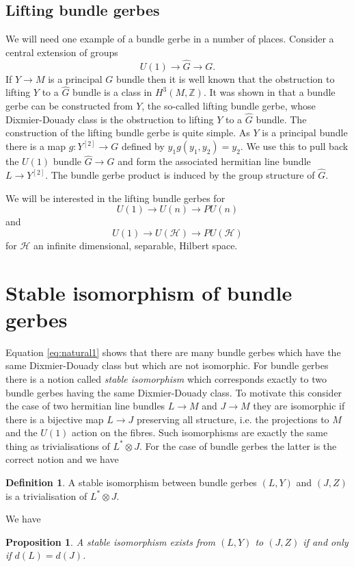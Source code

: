 \documentclass[a4paper,reqno]{amsart}
\theoremstyle{plain}
\newtheorem{proposition}[theorem]{Proposition}
\theoremstyle{definition}
\newtheorem{definition}[theorem]{Definition}
\theoremstyle{remark}
\numberwithin{equation}{section}
\numberwithin{figure}{section}
\newcommand{\cH}{{\mathcal H}}
\newcommand{\ZZ}{{\mathbb Z}}
\newcommand{\<}{\langle}
\renewcommand{\>}{\rangle}
\begin{document}
\subsection{Lifting bundle gerbes}
\label{sec:lbg}
We will need one example of a bundle gerbe in a number of places.
Consider a central
extension of groups
$$
U(1) \to \hat G \to G.
$$
If $Y \to M$ is a principal $G$ bundle then it is well known that the
obstruction to lifting $Y$ to a $\hat G$ bundle is a class in $H^3(M, \ZZ)$.
It was shown in \cite{Mur} that a bundle gerbe can be constructed
from $Y$, the so-called lifting bundle gerbe, whose Dixmier-Douady
class is the obstruction to lifting $Y$ to a $\hat G$ bundle. The construction
of the lifting bundle gerbe is quite simple. As $Y$ is a principal bundle
there is a map $g \colon Y^{[2]}\to G$ defined by $y_1 g(y_1, y_2) = y_2$.
We use this
to pull back the $U(1)$ bundle $\hat G \to G$ and form the associated hermitian
line bundle $L \to Y^{[2]}$. The bundle gerbe product is induced by the group
structure of $\hat G$.

We will be interested in the lifting bundle gerbes for
$$
U(1) \to U(n) \to PU(n)
$$
and
$$
U(1) \to U(\cH)\to PU(\cH)
$$
for $\cH$ an infinite dimensional, separable, Hilbert space.

\section{Stable isomorphism of bundle gerbes}
Equation \eqref{eq:natural1} shows that there are many
bundle gerbes which have the same Dixmier-Douady class but
which  are not isomorphic.
For bundle gerbes there is a  notion called {\em stable isomorphism}
which corresponds exactly to two bundle gerbes having the
same Dixmier-Douady class.  To motivate this consider the case
of two hermitian line bundles $L \to M$ and $J \to M$ they are isomorphic
if there is a bijective map $L \to J$ preserving all structure, i.e. the
projections to $M$ and the $U(1)$ action on the fibres.  Such isomorphisms
are exactly the same thing as trivialisations of $L^*\otimes J$.  For the
case of bundle gerbes the latter is the correct notion and we have
\begin{definition}
\label{def:stableiso}
A stable isomorphism between bundle gerbes  $(L, Y)$ and $(J, Z)$
is a trivialisation of $L^*\otimes J$.
\end{definition}


We  have \cite{MurSte}

\begin{proposition}
\label{prop:stable}
A stable isomorphism exists from  $(L, Y)$ to $(J, Z)$
if and only if $d(L) = d(J)$.
\end{proposition}
\end{document}
